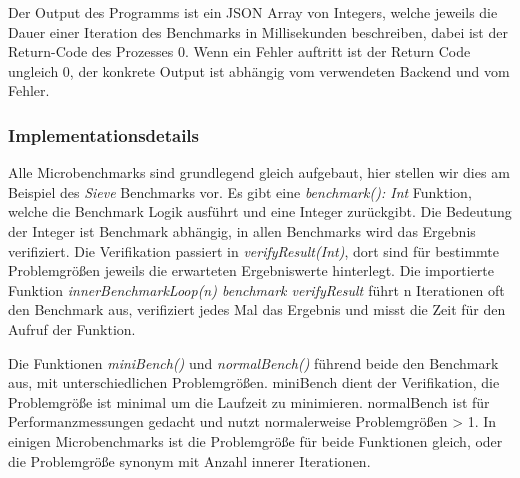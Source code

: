 Der Output des Programms ist ein JSON Array von Integers, welche jeweils die Dauer einer Iteration des Benchmarks in Millisekunden beschreiben, dabei ist der Return-Code des Prozesses 0.
Wenn ein Fehler auftritt ist der Return Code ungleich 0, der konkrete Output ist abhängig vom verwendeten Backend und vom Fehler. 

\subsubsection{Implementationsdetails}
Alle Microbenchmarks sind grundlegend gleich aufgebaut, hier stellen wir dies am Beispiel des \textit{Sieve} Benchmarks vor.
Es gibt eine \textit{benchmark(): Int} Funktion, welche die Benchmark Logik ausführt und eine Integer zurückgibt. Die Bedeutung der Integer ist Benchmark abhängig, in allen Benchmarks wird das Ergebnis verifiziert. Die Verifikation passiert in \textit{verifyResult(Int)}, dort sind für bestimmte Problemgrößen jeweils die erwarteten Ergebniswerte hinterlegt.
Die importierte Funktion \textit{innerBenchmarkLoop(n){ benchmark }{ verifyResult }} führt n Iterationen oft den Benchmark aus, verifiziert jedes Mal das Ergebnis und misst die Zeit für den Aufruf der Funktion.

Die Funktionen \textit{miniBench()} und \textit{normalBench()} führend beide den Benchmark aus, mit unterschiedlichen Problemgrößen. miniBench dient der Verifikation, die Problemgröße ist minimal um die Laufzeit zu minimieren.
normalBench ist für Performanzmessungen gedacht und nutzt normalerweise Problemgrößen > 1. In einigen Microbenchmarks ist die Problemgröße für beide Funktionen gleich, oder die Problemgröße synonym mit Anzahl innerer Iterationen.

